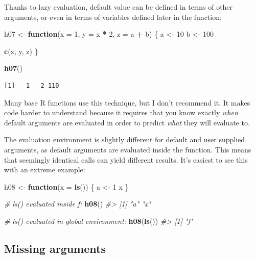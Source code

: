 \documentclass[]{book}
\newenvironment{Shaded}{\begin{snugshade}}{\end{snugshade}}
\newcommand{\CommentTok}[1]{\textcolor[rgb]{0.56,0.35,0.01}{\textit{#1}}}
\newcommand{\ControlFlowTok}[1]{\textcolor[rgb]{0.13,0.29,0.53}{\textbf{#1}}}
\newcommand{\DataTypeTok}[1]{\textcolor[rgb]{0.13,0.29,0.53}{#1}}
\newcommand{\DecValTok}[1]{\textcolor[rgb]{0.00,0.00,0.81}{#1}}
\newcommand{\KeywordTok}[1]{\textcolor[rgb]{0.13,0.29,0.53}{\textbf{#1}}}
\newcommand{\NormalTok}[1]{#1}
\newcommand{\OperatorTok}[1]{\textcolor[rgb]{0.81,0.36,0.00}{\textbf{#1}}}
\newcommand{\StringTok}[1]{\textcolor[rgb]{0.31,0.60,0.02}{#1}}
\theoremstyle{definition}
\theoremstyle{definition}
\theoremstyle{definition}
\theoremstyle{remark}
\begin{document}
Thanks to lazy evaluation, default value can be defined in terms of
other arguments, or even in terms of variables defined later in the
function:

\begin{Shaded}
\begin{Highlighting}[]
\NormalTok{h07 <-}\StringTok{ }\ControlFlowTok{function}\NormalTok{(}\DataTypeTok{x =} \DecValTok{1}\NormalTok{, }\DataTypeTok{y =}\NormalTok{ x }\OperatorTok{*}\StringTok{ }\DecValTok{2}\NormalTok{, }\DataTypeTok{z =}\NormalTok{ a }\OperatorTok{+}\StringTok{ }\NormalTok{b) \{}
\NormalTok{  a <-}\StringTok{ }\DecValTok{10}
\NormalTok{  b <-}\StringTok{ }\DecValTok{100}
  
  \KeywordTok{c}\NormalTok{(x, y, z)}
\NormalTok{\}}

\KeywordTok{h07}\NormalTok{()}
\end{Highlighting}
\end{Shaded}

\begin{verbatim}
[1]   1   2 110
\end{verbatim}

Many base R functions use this technique, but I don't recommend it. It
makes code harder to understand because it requires that you know
exactly \emph{when} default arguments are evaluated in order to predict
\emph{what} they will evaluate to.

The evaluation environment is slightly different for default and user
supplied arguments, as default arguments are evaluated inside the
function. This means that seemingly identical calls can yield different
results. It's easiest to see this with an extreme example:

\begin{Shaded}
\begin{Highlighting}[]
\NormalTok{h08 <-}\StringTok{ }\ControlFlowTok{function}\NormalTok{(}\DataTypeTok{x =} \KeywordTok{ls}\NormalTok{()) \{}
\NormalTok{  a <-}\StringTok{ }\DecValTok{1}
\NormalTok{  x}
\NormalTok{\}}

\CommentTok{# ls() evaluated inside f:}
\KeywordTok{h08}\NormalTok{()}
\CommentTok{#> [1] "a" "x"}

\CommentTok{# ls() evaluated in global environment:}
\KeywordTok{h08}\NormalTok{(}\KeywordTok{ls}\NormalTok{())}
\CommentTok{#> [1] "f"}
\end{Highlighting}
\end{Shaded}

\hypertarget{missing-arguments}{%
\subsection{Missing arguments}\label{missing-arguments}}
\end{document}
